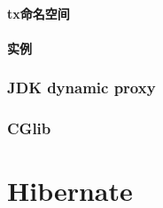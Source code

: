 \documentclass[a4paper,11pt]{article}
\begin{document}
\subsection[tx命名空间]{tx命名空间}
\subsection[实例]{实例}


\section[JDK dynamic proxy]{JDK dynamic proxy}

\section[CGlib]{CGlib}






\part[Hibernate]{Hibernate}
\end{document}
